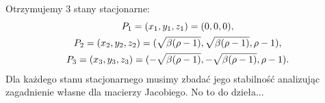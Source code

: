 \documentclass[a4paper,12pt,polish]{sphinxmanual}
\begin{document}
Otrzymujemy 3 stany stacjonarne:
\label{ch1/chI023:equation-eqn65}\begin{gather}
\begin{split}P_1 = (x_1, y_1, z_1) =  (0, 0, 0),\end{split}\label{ch1/chI023-eqn65}\\\begin{split}P_2 = (x_2, y_2, z_2) =  ( \sqrt{\beta ( \rho -1)}, \sqrt{\beta ( \rho -1)}, \rho - 1),\end{split}\notag\\\begin{split}P_3 = (x_3, y_3, z_3) =  ( - \sqrt{\beta ( \rho -1)}, -  \sqrt{\beta ( \rho -1)}, \rho - 1).\end{split}\notag
\end{gather}
Dla każdego stanu stacjonarnego musimy zbadać jego stabilność analizując zagadnienie własne dla macierzy Jacobiego. No to do dzieła...
\end{document}
